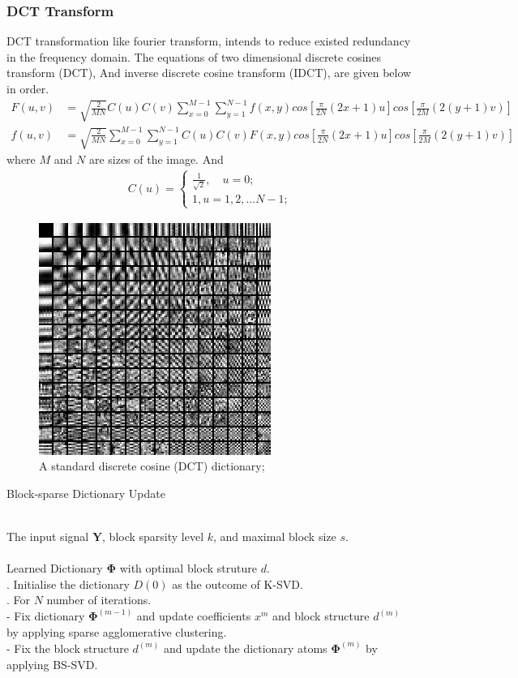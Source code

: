 
\subsubsection{DCT Transform}
DCT transformation like fourier transform, intends to reduce existed redundancy in the frequency domain. The equations of two dimensional discrete cosines transform (DCT), And inverse discrete cosine transform (IDCT), are given below in order.
\begin{align}
    F(u,v) &= \sqrt{\frac{2}{MN}}C(u)C(v)\sum_{x=0}^{M-1}\sum_{y=1}^{N-1}f(x,y)cos[\frac{\pi}{2N}(2x+1)u]cos[\frac{\pi}{2M}(2(y+1)v)] \\
    f(u,v) &= \sqrt{\frac{2}{MN}}\sum_{x=0}^{M-1}\sum_{y=1}^{N-1}C(u)C(v) F(x,y)cos[\frac{\pi}{2N}(2x+1)u]cos[\frac{\pi}{2M}(2(y+1)v)]
\end{align}
where $M$ and $N$ are sizes of the image. And 
\begin{align}
    C(u) = \begin{cases}
    \frac{1}{\sqrt{2}}, \quad u=0;\\
    1, u=1,2,...N-1;
    \end{cases}
\end{align}

\begin{figure}[!htbp]
\centering
\includegraphics[width=0.2\linewidth]{images/DCT_dict.png}
\caption{A standard discrete cosine (DCT) dictionary;}
\label{dic1}
\end{figure}

\begin{algorithm}[!htbp] 
\caption{Block-sparse Dictionary Update}
\label{alg:Framwork} 
\begin{algorithmic}
\REQUIRE ~~\\%
The input signal $\mathbf{Y}$, block sparsity level $k$, and maximal block size $s$.\\
\ENSURE ~~\\ %
Learned Dictionary $\mathbf{\Phi}$ with optimal block struture $d$.\\
. Initialise the dictionary $D(0)$ as the outcome of K-SVD.\\
. For $N$ number of iterations.\\
\STATE \quad - Fix dictionary $\mathbf{\Phi}^{(m-1)}$ and update coefficients $x^{m}$ and block structure $d^{(m)}$ by applying sparse agglomerative clustering.\\
\STATE \quad - Fix the block structure $d^(m)$ and update the dictionary atoms $\mathbf{\Phi}^{(m)}$ by applying BS-SVD.\\
\end{algorithmic}
\end{algorithm}
